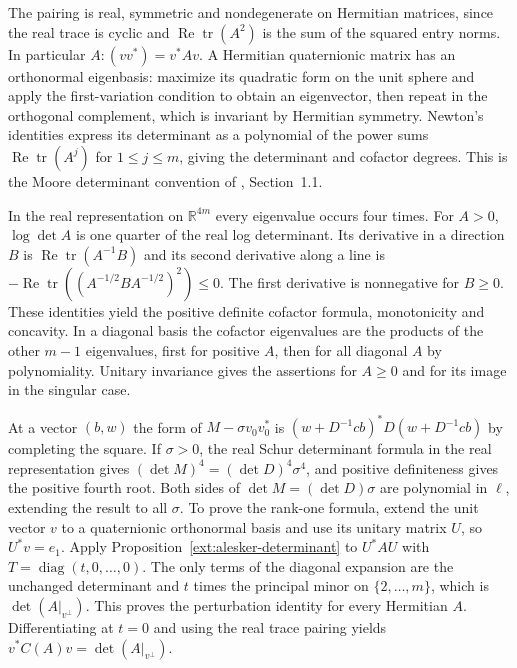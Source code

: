 The pairing is real, symmetric and nondegenerate on Hermitian matrices, since the real trace is cyclic and $\operatorname{Re}\operatorname{tr}(A^2)$ is the sum of the squared entry norms. In particular $A:(vv^*)=v^*Av$. A Hermitian quaternionic matrix has an orthonormal eigenbasis: maximize its quadratic form on the unit sphere and apply the first-variation condition to obtain an eigenvector, then repeat in the orthogonal complement, which is invariant by Hermitian symmetry. Newton's identities express its determinant as a polynomial of the power sums $\operatorname{Re}\operatorname{tr}(A^j)$ for $1\le j\le m$, giving the determinant and cofactor degrees. This is the Moore determinant convention of \cite{r-2}, Section~1.1.

In the real representation on $\mathbb R^{4m}$ every eigenvalue occurs four times. For $A>0$, $\log\det A$ is one quarter of the real log determinant. Its derivative in a direction $B$ is $\operatorname{Re}\operatorname{tr}(A^{-1}B)$ and its second derivative along a line is $-\operatorname{Re}\operatorname{tr}((A^{-1/2}BA^{-1/2})^2)\le0$. The first derivative is nonnegative for $B\ge0$. These identities yield the positive definite cofactor formula, monotonicity and concavity. In a diagonal basis the cofactor eigenvalues are the products of the other $m-1$ eigenvalues, first for positive $A$, then for all diagonal $A$ by polynomiality. Unitary invariance gives the assertions for $A\ge0$ and for its image in the singular case.

At a vector $(b,w)$ the form of $M-\sigma v_0v_0^*$ is $(w+D^{-1}cb)^*D(w+D^{-1}cb)$ by completing the square. If $\sigma>0$, the real Schur determinant formula in the real representation gives $(\det M)^4=(\det D)^4\sigma^4$, and positive definiteness gives the positive fourth root. Both sides of $\det M=(\det D)\sigma$ are polynomial in $\ell$, extending the result to all $\sigma$. To prove the rank-one formula, extend the unit vector $v$ to a quaternionic orthonormal basis and use its unitary matrix $U$, so $U^*v=e_1$. Apply Proposition~\ref{ext:alesker-determinant} to $U^*AU$ with $T=\operatorname{diag}(t,0,\ldots,0)$. The only terms of the diagonal expansion are the unchanged determinant and $t$ times the principal minor on $\{2,\ldots,m\}$, which is $\det(A|_{v^\perp})$. This proves the perturbation identity for every Hermitian $A$. Differentiating at $t=0$ and using the real trace pairing yields $v^* C(A)v=\det(A|_{v^\perp})$.
